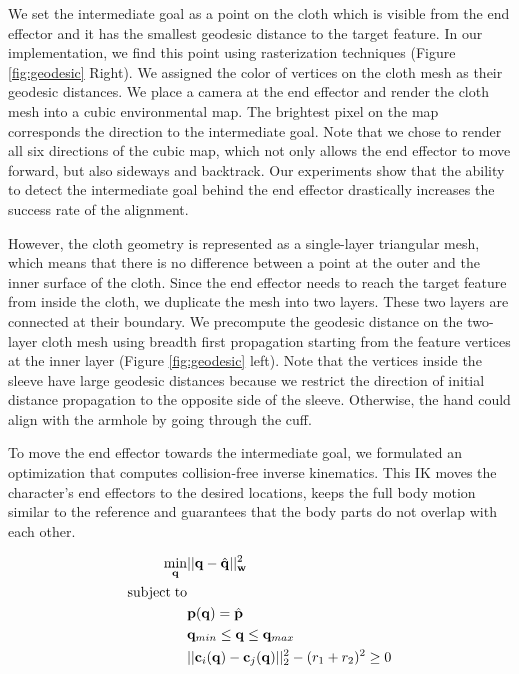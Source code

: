 We set the intermediate goal as a point on the cloth which is visible from the end effector and it has the smallest geodesic distance to the target feature. In our implementation, we find this point using rasterization techniques (Figure \ref{fig:geodesic} Right). We assigned the color of vertices on the cloth mesh as their geodesic distances. We place a camera at the end effector and render the cloth mesh into a cubic environmental map. The brightest pixel on the map corresponds the direction to the intermediate goal. Note that we chose to render all six directions of the cubic map, which not only allows the end effector to move forward, but also sideways and backtrack. Our experiments show that the ability to detect the intermediate goal behind the end effector drastically increases the success rate of the alignment.

However, the cloth geometry is represented as a single-layer triangular mesh, which means that there is no difference between a point at the outer and the inner surface of the cloth. Since the end effector needs to reach the target feature from inside the cloth, we duplicate the mesh into two layers. These two layers are connected at their boundary. We precompute the geodesic distance on the two-layer cloth mesh using breadth first propagation starting from the feature vertices at the inner layer (Figure \ref{fig:geodesic} left). Note that the vertices inside the sleeve have large geodesic distances because we restrict the direction of initial distance propagation to the opposite side of the sleeve. Otherwise, the hand could align with the armhole by going through the cuff. 

To move the end effector towards the intermediate goal, we formulated an optimization that computes collision-free inverse kinematics. This IK moves the character's end effectors to the desired locations, keeps the full body motion similar to the reference and guarantees that the body parts do not overlap with each other.

\begin{align}
\label{eq:IK}
  \min_{\mathbf{q}} & ||\mathbf{q} - \hat{\mathbf{q}}||_{\mathbf{w}}^2 \\
  \nonumber  \mathrm{subject\;} \mathrm{to} & \\
  \nonumber  &\mathbf{p}(\mathbf{q}) = \hat{\mathbf{p}}\\
  \nonumber   &\mathbf{q}_{min} \leq \mathbf{q} \leq \mathbf{q}_{max}\\
  \nonumber   &||\mathbf{c}_i(\mathbf{q}) - \mathbf{c}_j(\mathbf{q})||_2^2 - (r_1 + r_2)^2 \geq 0
\end{align}

